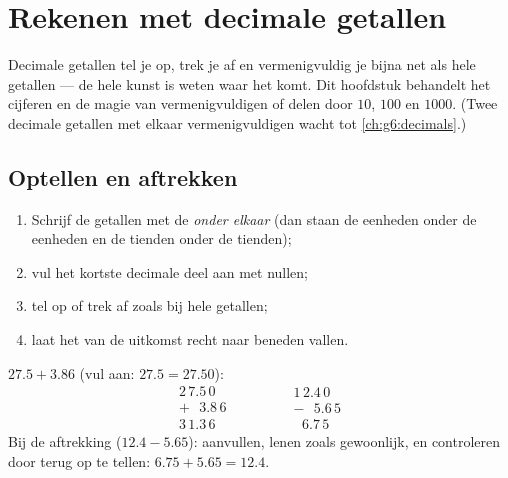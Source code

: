 \chapter{Rekenen met decimale getallen}\label{ch:g5:decimalops}

Decimale getallen tel je op, trek je af en vermenigvuldig je bijna net als
hele getallen --- de hele kunst is weten waar het  komt. Dit
hoofdstuk behandelt het cijferen en de magie van vermenigvuldigen of delen
door $10$, $100$ en $1000$. (Twee decimale getallen met elkaar
vermenigvuldigen wacht tot \cref{ch:g6:decimals}.)

\section{Optellen en aftrekken}

\begin{method}\label{met:g5:decimalops:addsub}
\begin{enumerate}
  \item Schrijf de getallen met de \emph{ onder elkaar} (dan
        staan de eenheden onder de eenheden en de tienden onder de
        tienden);
  \item vul het kortste decimale deel aan met nullen;
  \item tel op of trek af zoals bij hele getallen;
  \item laat het  van de uitkomst recht naar beneden vallen.
\end{enumerate}
\end{method}

\begin{example}\label{ex:g5:decimalops:addsub}
$27.5 + 3.86$ (vul aan: $27.5 = 27.50$):
\[
\begin{array}{r}
2\,7.5\,0 \\
+\ \ \ 3.8\,6 \\
\hline
3\,1.3\,6
\end{array}
\qquad\qquad
\begin{array}{r}
1\,2.4\,0 \\
-\ \ \ 5.6\,5 \\
\hline
\ \ \,6.7\,5
\end{array}
\]
Bij de aftrekking ($12.4 - 5.65$): aanvullen, lenen zoals gewoonlijk, en
controleren door terug op te tellen: $6.75 + 5.65 = 12.4$.
\end{example}

